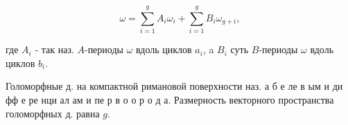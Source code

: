 \documentclass[10pt]{article}
\begin{document}
\[

\omega=\sum_{i=1}^{g} A_{i} \omega_{i}+\sum_{i=1}^{g} B_{i} \omega_{g+i},

\]



где $A_{i}$ - так наз. $A$-периоды $\omega$ вдоль циклов $a_{i}$, a $B_{i}$ суть $B$-периоды $\omega$ вдоль циклов $b_{i}$.



Голоморфные д. на компактной римановой поверхности наз. а б е ле в ым и ди фф е ре нци ал ам и пе р в о о р о д а. Размерность векторного пространства голоморфных д. равна $g$.
\end{document}
